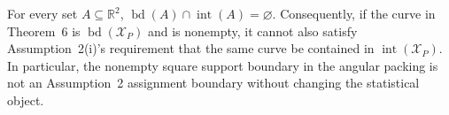 For every set \(A\subseteq\mathbb R^2\), \(\operatorname{bd}(A)\cap\operatorname{int}(A)=\varnothing\).  Consequently, if the curve in Theorem~6 is \(\operatorname{bd}(\mathcal X_P)\) and is nonempty, it cannot also satisfy Assumption~2(i)'s requirement that the same curve be contained in \(\operatorname{int}(\mathcal X_P)\).  In particular, the nonempty square support boundary in the angular packing is not an Assumption~2 assignment boundary without changing the statistical object.